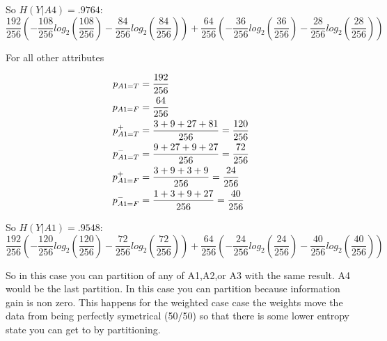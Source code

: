 \documentclass[12pt]{article}
\begin{document}
 So $H(Y|A4)=.9764$: 
 \begin{equation*}
 \frac{192}{256}(-\frac{108}{256}log_2(\frac{108}{256})-\frac{84}{256}log_2(\frac{84}{256}))+
 \frac{64}{256}(-\frac{36}{256}log_2(\frac{36}{256})-\frac{28}{256}log_2(\frac{28}{256}))
 \end{equation*}
 
 For all other attributes 
 
 \begin{align}
    p_{A1=T} &= \frac{192}{256} \notag \\
    p_{A1=F} &= \frac{64}{256} \notag \\
    p_{A1=T}^+ &=\frac{3+9+27+81}{256} = \frac{120}{256} \notag \\
    p_{A1=T}^- &= \frac{9+27+9+27}{256} = \frac{72}{256} \notag \\
    p_{A1=F}^+ &= \frac{3+9+3+9}{256} = \frac{24}{256} \notag \\
    p_{A1=F}^- &= \frac{1+3+9+27}{256} = \frac{40}{256} \notag
 \end{align}
 
  So $H(Y|A1)= .9548$: 
 \begin{equation*}
 \frac{192}{256}(-\frac{120}{256}log_2(\frac{120}{256})-\frac{72}{256}log_2(\frac{72}{256}))+
 \frac{64}{256}(-\frac{24}{256}log_2(\frac{24}{256})-\frac{40}{256}log_2(\frac{40}{256}))
 \end{equation*}
 
 So in this case you can partition of any of A1,A2,or A3 with the same result. A4 would be the last
 partition. In this case you can partition because information gain is non zero. This happens 
 for the weighted case case the weights move the data from being perfectly symetrical (50/50) 
 so that there is some lower entropy state you can get to by partitioning. 
\end{document}
